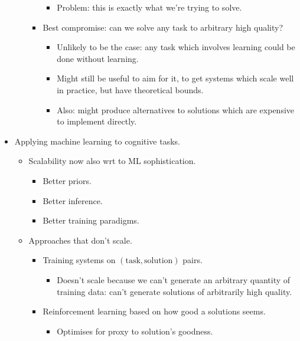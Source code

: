 \begin{itemize}
\begin{itemize}
\begin{itemize}
            \begin{itemize}
                \item Problem: this is exactly what we're trying to solve.
            \end{itemize}
            \item Best compromise: can we solve any task to arbitrary high quality?
            \begin{itemize}
                \item Unlikely to be the case: any task which involves learning could be done without learning.
                \item Might still be useful to aim for it, to get systems which scale well in practice, but have theoretical bounds.
                \item Also: might produce alternatives to solutions which are expensive to implement directly.
            \end{itemize}
        \end{itemize}
    \end{itemize}
    \item Applying machine learning to cognitive tasks.
    \begin{itemize}
        \item Scalability now also wrt to ML sophistication.
        \begin{itemize}
            \item Better priors.
            \item Better inference.
            \item Better training paradigms.
        \end{itemize}
        \item Approaches that don't scale.
        \begin{itemize}
            \item Training systems on $(\text{task}, \text{solution})$ pairs.
            \begin{itemize}
                \item Doesn't scale because we can't generate an arbitrary quantity of training data: can't generate solutions of arbitrarily high quality.
            \end{itemize}
            \item Reinforcement learning based on how good a solutions seems.
            \begin{itemize}
                \item Optimises for proxy to solution's goodness.

\end{itemize}
\end{itemize}
\end{itemize}
\end{itemize}
